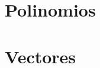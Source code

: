 \documentclass[12pt]{article}
\begin{document}
\tableofcontents







\section{Polinomios}


\section{Vectores}

\end{document}
